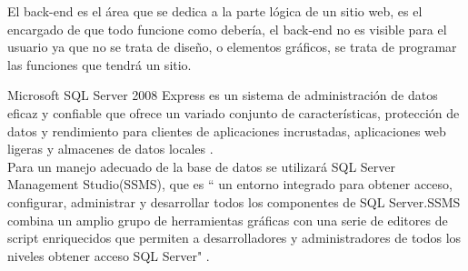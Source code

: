 El back-end es el área que se dedica a la parte lógica de un sitio web, es el encargado de que todo funcione como debería, el back-end no es visible para el usuario ya que no se trata de diseño, o elementos gráficos, se trata de programar las funciones que tendrá un sitio.


Microsoft SQL Server 2008 Express es un sistema de administración de datos eficaz y confiable que ofrece un variado conjunto de características, protección de datos y rendimiento para clientes de aplicaciones incrustadas, aplicaciones web ligeras y almacenes de datos locales \cite{mic15}.
\\


Para un manejo adecuado de la base de datos se utilizará SQL Server Management Studio(SSMS), que es `` un entorno integrado para obtener acceso, configurar, administrar y desarrollar todos los componentes de SQL Server.SSMS combina un amplio grupo de herramientas gráficas con una serie de editores de script enriquecidos que permiten a desarrolladores y administradores de todos los niveles obtener acceso SQL Server" \cite{mic15}.







